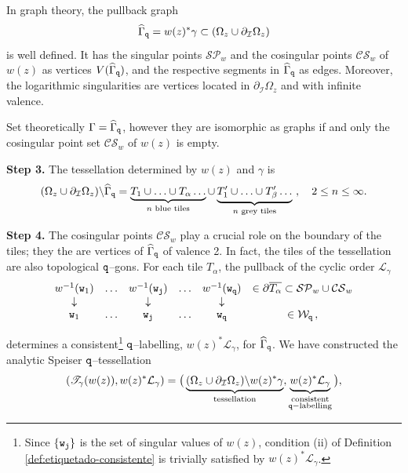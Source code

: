 \documentclass[final,3p,times]{elsarticle}
\theoremstyle{definition}
\begin{document}
\noindent 
In graph theory, the pullback graph 
$$
\widehat{\Gamma}_{\tt q}=w(z)^* \gamma  
\subset ( \Omega_z \cup \partial_{\mathcal{I}}\Omega_z )
$$
is well defined.
It has the singular points $\mathcal{SP}_w$
and the cosingular points $\mathcal{CS}_w$ of $w(z)$ as vertices $V(\widehat{\Gamma}_{\tt q})$,
and the respective segments in $\widehat{\Gamma}_{\tt q}$ as edges.
Moreover, the logarithmic singularities are vertices located in $\partial_{\mathcal{I}}\Omega_z$ 
and with infinite valence.

\noindent 
Set theoretically $\Gamma = \widehat{\Gamma}_{\tt q}$,  
however they are isomorphic as graphs if and only 
the cosingular point set $\mathcal{CS}_w$ of $w(z)$ 
is empty.

\noindent 
{\bf Step 3.} 
The tessellation 
determined by $w(z)$ and $\gamma$ is 
$$
( \Omega_z \cup \partial_{\mathcal{I}}\Omega_z ) \backslash \widehat{\Gamma}_{\tt q}
=
\underbrace{
T_1 \cup \ldots \cup T_\alpha \ldots  }_{n \text{ blue tiles} }
\cup 
\underbrace{ T^\prime_1 \cup  
\ldots  \cup T^\prime_\beta \ldots  }_{ n\text{ grey tiles}} \ , 
\ \ \ 
2 \leq n \leq \infty .
$$



\noindent 
{\bf Step 4.} 
The cosingular points $\mathcal{CS}_w$ play a crucial role
on the boundary of the tiles; they the are vertices of 
$\widehat{\Gamma}_{\tt q}$ of valence 2. 
In fact, the tiles of the tessellation %
are also topological $\tt q$--gons.
For each tile $T_\alpha$, the pullback of the 
cyclic order $\mathcal{L}_\gamma$
\begin{equation}
\label{eq:pullback-etiquetado-de-gamma}
\begin{array}{cccccc}
w^{-1}({\tt w}_1) & \ldots & w^{-1}({\tt w}_{\tt j}) & \ldots & w^{-1}({\tt w}_{\tt q}) & \in \partial \overline{T_\alpha} \subset \mathcal{SP}_w \cup \mathcal{CS}_w
\\
\downarrow & & \downarrow & & \downarrow & 
\\
{\tt w}_1 & \ldots & {\tt w}_{\tt j} & \ldots & {\tt w}_{\tt q} & \in \mathcal{W}_{\tt q} \, ,
\end{array}
\end{equation}

\noindent
determines 
a consistent\footnote{
Since $\{ {\tt w}_{\tt j} \}$ is the set of singular values of $w(z)$, 
condition (ii) of Definition \ref{def:etiquetado-consistente} is trivially satisfied by $w(z)^*\mathcal{L}_{\gamma}$.
} 
$\tt q$--labelling, $w(z)^*\mathcal{L}_\gamma$, for $\widehat{\Gamma}_{\tt q}$. 
We have constructed the analytic
Speiser $\tt q$--tessellation 
%
\begin{equation}\label{eq:tesellation-of-w}
(\mathscr{T}_\gamma(w(z)),w(z)^*\mathcal{L}_\gamma ) =
\big( \underbrace{(\Omega_z \cup \partial_{\mathcal{I}}\Omega_z ) \backslash w(z)^* \gamma}_{
\text{tessellation}}, 
\underbrace{w(z)^*\mathcal{L}_\gamma}_{\substack{\text{consistent}\\ {\tt q}-\text{labelling}}} 
\big),
\end{equation}
\end{document}
